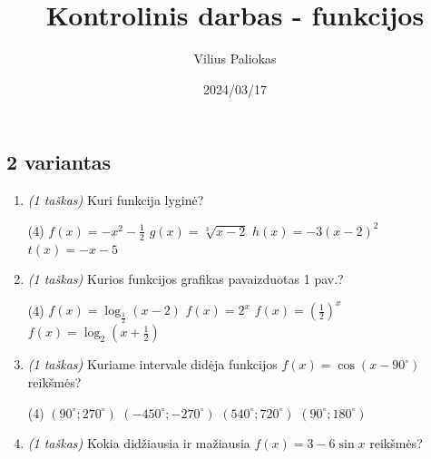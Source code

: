 \documentclass[a4paper]{article}
\title{Kontrolinis darbas - funkcijos}
\author{Vilius Paliokas}
\date{2024/03/17}
\begin{document}
\thispagestyle{fancy}

\titlespacing*{\subsection}{0pt}{.75ex}{0.75ex}

\subsection*{2 variantas}

\begin{enumerate}
      \item \textit{(1 taškas)} Kuri funkcija lyginė?
            \begin{tasks}[item-format={\normalfont}, after-item-skip=2mm,
                        label=\Alph*, label-format={\bfseries}](4)
                  \task $f(x)=-x^2-\frac{1}{2}$
                  \task $g(x)=\sqrt[3]{x-2}$
                  \task $h(x)=-3(x-2)^2$
                  \task $t(x)=-x-5$
            \end{tasks}

      \item \textit{(1 taškas)} Kurios funkcijos grafikas pavaizduotas 1 pav.?
            \begin{tasks}[item-format={\normalfont}, after-item-skip=2mm,
                        label=\Alph*, label-format={\bfseries}](4)
                  \task $f(x)=\log_{\frac{1}{2}}(x-2)$
                  \task $f(x)=2^x$
                  \task $f(x)=(\frac{1}{2})^x$
                  \task $f(x)=\log_{2}(x+\frac{1}{2})$
            \end{tasks}

      \item \textit{(1 taškas)} Kuriame intervale didėja funkcijos
            $f(x)=\cos(x-90^\circ)$ reikšmės?
            \begin{tasks}[item-format={\normalfont}, after-item-skip=2mm,
                        label=\Alph*, label-format={\bfseries}](4)
                  \task $(90^\circ; 270^\circ)$
                  \task $(-450^\circ; -270^\circ)$
                  \task $(540^\circ; 720^\circ)$
                  \task $(90^\circ; 180^\circ)$
            \end{tasks}

      \item \textit{(1 taškas)} Kokia didžiausia ir mažiausia $f(x)=3-6\sin{x}$
            reikšmės?
            \vspace{7mm}


\end{enumerate}
\end{document}
